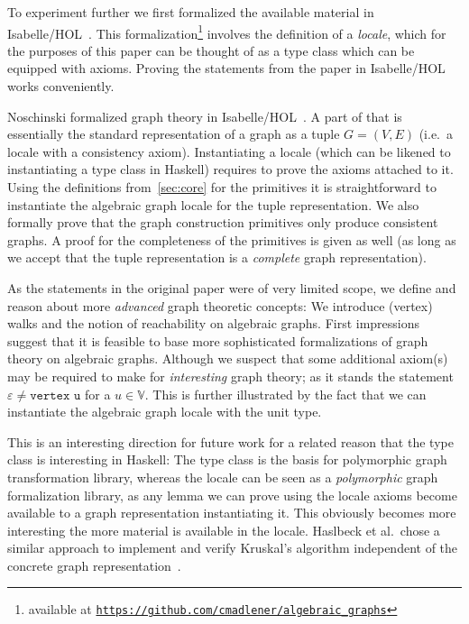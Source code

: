\documentclass{article}
\newcommand{\hs}{\texttt}
\renewcommand{\epsilon}{\varepsilon}
\newcommand{\eps}{\epsilon}
\begin{document}
To experiment further we first formalized the available material in
Isabelle/HOL~\cite{isabelle}.
This formalization\footnote{available at
  \texttt{\href{https://github.com/cmadlener/algebraic_graphs}{https://github.com/cmadlener/algebraic\_graphs}}}
involves the definition of a \textit{locale}, which for the
purposes of this paper can be thought of as a type class which can be equipped
with axioms. Proving the statements from the paper in Isabelle/HOL works
conveniently.

Noschinski formalized graph theory in
Isabelle/HOL~\cite{GraphTheory-AFP}. A part of that is essentially the standard
representation of a graph as a tuple $G=(V,E)$ (i.e.\ a locale with a
consistency axiom). Instantiating a locale (which can be likened to
instantiating a type class in Haskell) requires to prove the axioms attached to
it. Using the definitions from~\autoref{sec:core} for the primitives it is
straightforward to instantiate the algebraic graph locale for the tuple
representation. We also formally prove that the graph construction primitives only
produce consistent graphs. A proof for the completeness of the primitives is
given as well (as long as we accept that the tuple representation is a
\textit{complete} graph representation).

As the statements in the original paper were of very limited scope, we 
define and reason about more \textit{advanced} graph theoretic concepts: We
introduce (vertex) walks and the notion of reachability on algebraic graphs.
First impressions suggest that it is feasible to base more sophisticated
formalizations of graph theory on algebraic graphs. Although we suspect that
some additional axiom(s) may be required to make for \textit{interesting} graph
theory; as it stands the statement $\eps \neq \hs{vertex u}$ for a $u \in
\mathbb{V}$. This is further illustrated by the fact that we can instantiate the
algebraic graph locale with the unit type.

This is an interesting direction for future work for a related reason that the
type class is interesting in Haskell: The type class is the basis for 
polymorphic graph transformation library, whereas the locale can be
seen as a \textit{polymorphic} graph formalization library, as any lemma we can prove
using the locale axioms become available to a graph representation
instantiating it. This obviously becomes more interesting the more material is
available in the locale. Haslbeck et al.\ chose a similar approach to implement
and verify Kruskal's algorithm independent of the concrete graph
representation~\cite{Kruskal-AFP}.
\end{document}
